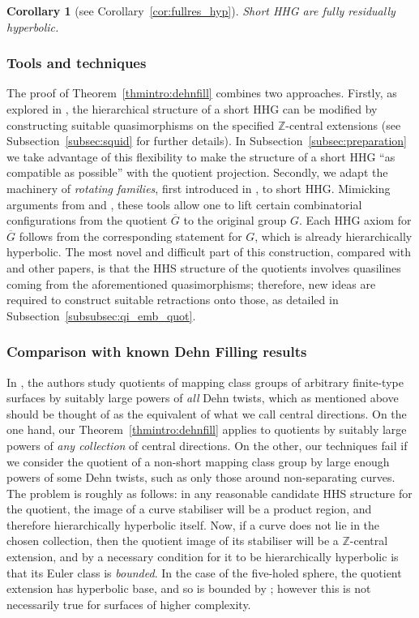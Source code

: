 \documentclass[svgnames]{amsart}
\theoremstyle{plain}
\newtheorem{corintro}[thmintro]{Corollary}
\theoremstyle{definition}
\newcommand{\Z}{\mathbb{Z}}
\newcommand{\ov}[1]{\overline{#1}}
\begin{document}
\begin{corintro}[{see Corollary~\ref{cor:fullres_hyp}}]\label{corintro:fullres}
    Short HHG are fully residually hyperbolic.
\end{corintro}

\subsubsection*{Tools and techniques}
The proof of Theorem~\ref{thmintro:dehnfill} combines two approaches. Firstly, as explored in \cite{Short_HHG:I}, the hierarchical structure of a short HHG can be modified by constructing suitable quasimorphisms on the specified $\Z$-central extensions (see Subsection~\ref{subsec:squid} for further details). In Subsection~\ref{subsec:preparation} we take advantage of this flexibility to make the structure of a short HHG ``as compatible as possible'' with the quotient projection. Secondly, we adapt the machinery of \emph{rotating families}, first introduced in \cite{dahmani:rotating}, to short HHG. Mimicking arguments from \cite{dfdt} and \cite{BHMS}, these tools allow one to lift certain combinatorial configurations from the quotient $\ov G$ to the original group $G$. Each HHG axiom for $\ov G$ follows from the corresponding statement for $G$, which is already hierarchically hyperbolic. The most novel and difficult part of this construction, compared with \cite{BHMS} and other papers, is that the HHS structure of the quotients involves quasilines coming from the aforementioned quasimorphisms; therefore, new ideas are required to construct suitable retractions onto those, as detailed in Subsection~\ref{subsubsec:qi_emb_quot}. 



\subsubsection*{Comparison with known Dehn Filling results}
In \cite{BHMS}, the authors study quotients of mapping class groups of arbitrary finite-type surfaces by suitably large powers of \emph{all} Dehn twists, which as mentioned above should be thought of as the equivalent of what we call central directions. On the one hand, our Theorem~\ref{thmintro:dehnfill} applies to quotients by suitably large powers of \emph{any collection} of central directions. On the other, our techniques fail if we consider the quotient of a non-short mapping class group by large enough powers of some Dehn twists, such as only those around non-separating curves. The problem is roughly as follows: in any reasonable candidate HHS structure for the quotient, the image of a curve stabiliser will be a product region, and therefore hierarchically hyperbolic itself. Now, if a curve does not lie in the chosen collection, then the quotient image of its stabiliser will be a $\Z$-central extension, and by \cite[Corollary 4.3]{HRSS_3manifold} a necessary condition for it to be hierarchically hyperbolic is that its Euler class is \emph{bounded}. In the case of the five-holed sphere, the quotient extension has hyperbolic base, and so is bounded by \cite{neumannreeves}; however this is not necessarily true for surfaces of higher complexity. 
\end{document}
